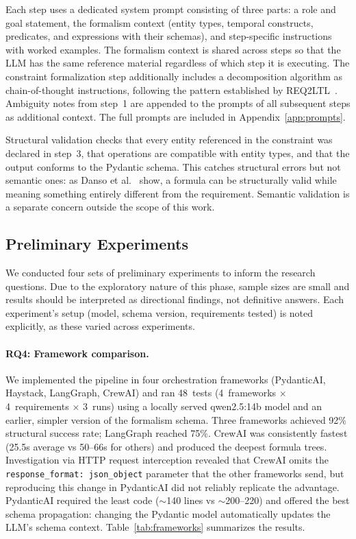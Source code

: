 Each step uses a dedicated system prompt consisting of three parts: a
role and goal statement, the formalism context (entity types, temporal
constructs, predicates, and expressions with their schemas), and
step-specific instructions with worked examples. The formalism context is
shared across steps so that the LLM has the same reference material
regardless of which step it is executing. The constraint formalization
step additionally includes a decomposition algorithm as chain-of-thought
instructions, following the pattern established by
REQ2LTL~\cite{ma2025req2ltl}. Ambiguity notes from step~1 are appended
to the prompts of all subsequent steps as additional context. The full
prompts are included in Appendix~\ref{app:prompts}.

Structural validation checks that every entity referenced in the
constraint was declared in step~3, that operations are compatible with
entity types, and that the output conforms to the Pydantic schema. This
catches structural errors but not semantic ones: as Danso
et al.~\cite{danso2026syntax} show, a formula can be structurally valid
while meaning something entirely different from the requirement. Semantic
validation is a separate concern outside the scope of this work.

\subsection{Preliminary Experiments}
\label{sec:experiments}

We conducted four sets of preliminary experiments to inform the research
questions. Due to the exploratory nature of this phase, sample sizes are
small and results should be interpreted as directional findings, not
definitive answers. Each experiment's setup (model, schema version,
requirements tested) is noted explicitly, as these varied across
experiments.

\paragraph{RQ4: Framework comparison.}
We implemented the pipeline in four orchestration frameworks (PydanticAI,
Haystack, LangGraph, CrewAI) and ran 48~tests (4~frameworks $\times$
4~requirements $\times$ 3~runs) using a locally served qwen2.5:14b model
and an earlier, simpler version of the formalism schema. Three frameworks
achieved 92\% structural success rate; LangGraph reached 75\%. CrewAI was
consistently fastest (25.5s average vs 50--66s for others) and produced
the deepest formula trees. Investigation via HTTP request interception
revealed that CrewAI omits the \texttt{response\_format: json\_object}
parameter that the other frameworks send, but reproducing this change in
PydanticAI did not reliably replicate the advantage. PydanticAI required
the least code (${\sim}$140 lines vs ${\sim}$200--220) and offered the
best schema propagation: changing the Pydantic model automatically
updates the LLM's schema context. Table~\ref{tab:frameworks}
summarizes the results.

